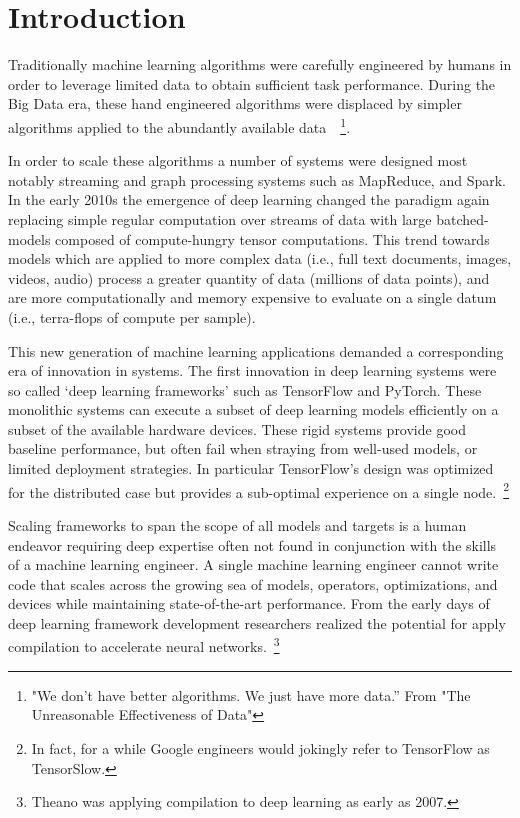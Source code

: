 \chapter{Introduction}
\label{ch:intro}

Traditionally machine learning algorithms were carefully engineered by humans
  in order to leverage limited data to obtain sufficient task performance.
During the Big Data era, these hand engineered algorithms were displaced by
  simpler algorithms applied to the abundantly available data~\citep{unreasonable}~\footnote{"We don’t have better algorithms. We just have more data.” From "The Unreasonable Effectiveness of Data"}.

In order to scale these algorithms a number of systems were
  designed most notably streaming and graph processing systems such as MapReduce, and Spark.
In the early 2010s the emergence of deep learning changed the paradigm again
  replacing simple regular computation over streams of data with large batched-models
  composed of compute-hungry tensor computations.
This trend towards models which are applied to more complex data (i.e., full text documents, images, videos, audio)
  process a greater quantity of data (millions of data points), and are more computationally and memory expensive
  to evaluate on a single datum (i.e., terra-flops of compute per sample).

This new generation of machine learning applications demanded a corresponding era of
  innovation in systems.
The first innovation in deep learning systems were so called
  ‘deep learning frameworks’ such as TensorFlow and PyTorch.
These monolithic systems can execute a subset of deep learning models
  efficiently on a subset of the available hardware devices.
These rigid systems provide good baseline performance, but often fail
  when straying from well-used models, or limited deployment strategies.
In particular TensorFlow's design was optimized for the distributed case
  but provides a sub-optimal experience on a single node.~\footnote{In fact, for a while Google engineers would jokingly refer to TensorFlow as TensorSlow.}

Scaling frameworks to span the scope of all models and targets is a human endeavor
  requiring deep expertise often not found in conjunction with the skills of a
  machine learning engineer.
A single machine learning engineer cannot write code that scales across the growing
  sea of models, operators, optimizations, and devices while maintaining state-of-the-art
  performance.
From the early days of deep learning framework development researchers realized the
  potential for apply compilation to accelerate neural networks.~\footnote{Theano was applying
  compilation to deep learning as early as 2007.}

